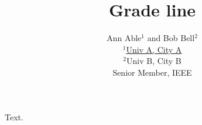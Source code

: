 \documentclass{article}
\title{Grade line}
\author{Ann Able$^{1}$ and Bob Bell$^{2}$\membermark{1}\\
$^{1}$\href{https://a.edu}{Univ A, City A}\\
$^{2}$Univ B, City B\\
\membermark{1}Senior Member, IEEE}
\begin{document}
\maketitle
Text.
\end{document}
